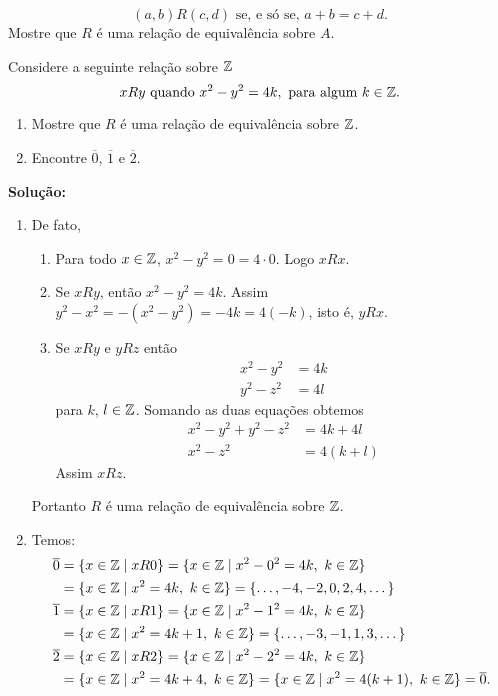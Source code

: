 \documentclass[12pt]{article}
\begin{document}
\[
	(a,b)R(c,d) \mbox{ se, e s\'o se, } a + b = c + d.
\]
Mostre que $R$ \'e uma rela\c{c}\~ao de equival\^encia sobre $A$.

\vspace{.5cm}

\questao Considere a seguinte rela\c{c}\~ao sobre $\mathbb{Z}$
\[
	xRy \mbox{ quando } x^2 - y^2 = 4k, \mbox{ para algum } k \in \mathbb{Z}.
\]

\begin{enumerate}[label={\alph*})]
	\item Mostre que $R$ \'e uma rela{\c c}{\~a}o de equival{\^e}ncia sobre $\mathbb{Z}$.
	\item Encontre $\overline{0}$, $\overline{1}$ e $\overline{2}$.
\end{enumerate}

\noindent\textbf{Solu\c{c}\~ao:}
	\begin{enumerate}[label={\alph*})]
		\item De fato,
		\begin{enumerate}[label={\roman*})]
			\item Para todo $x \in \mathbb{Z}$, $x^2 - y^2 = 0 = 4\cdot 0$. Logo $xRx$.
			\item Se $xRy$, ent\~ao $x^2 - y^2 = 4k$. Assim $y^2 - x^2 = -(x^2 - y^2) = -4k = 4(-k)$, isto \'e, $yRx$.
			\item Se $xRy$ e $yRz$ ent\~ao
			\begin{align}
				x^2 - y^2 &= 4k\label{primeira_equacao}\\
				y^2 - z^2 &= 4l\label{segunda_equacao}
			\end{align}
			para $k$, $l \in \mathbb{Z}$.
			Somando as duas equa\c{c}\~oes obtemos
			\begin{align}\label{terceira_equacao}
				x^2 - y^2 + y^2 - z^2 &= 4k + 4l\\
				x^2 - z^2 &= 4(k + l)
			\end{align}
			Assim $xRz$.
		\end{enumerate}

		Portanto $R$ \'e uma rela\c{c}\~ao de equival\^encia sobre $\mathbb{Z}$.

		\item Temos:
		\begin{align*}
			\overline{0} &= \{x \in \mathbb{Z} \mid xR0\} = \{x \in \mathbb{Z} \mid x^2 - 0^2 = 4k,\ k \in \mathbb{Z}\} \\
			&= \{x \in \mathbb{Z} \mid x^2 = 4k, \ k \in \mathbb{Z}\} = \{\dots, -4,-2,0,2,4, \dots\}\\
			\overline{1} &= \{x \in \mathbb{Z} \mid xR1\} = \{x \in \mathbb{Z} \mid x^2 - 1^2 = 4k,\ k \in \mathbb{Z}\} \\
			&= \{x \in \mathbb{Z} \mid x^2 = 4k + 1, \ k \in \mathbb{Z}\} = \{\dots, -3,-1,1,3, \dots\}\\
			\overline{2} &= \{x \in \mathbb{Z} \mid xR2\} = \{x \in \mathbb{Z} \mid x^2 - 2^2 = 4k,\ k \in \mathbb{Z}\} \\
			&= \{x \in \mathbb{Z} \mid x^2 = 4k + 4, \ k \in \mathbb{Z}\} = \{x \in \mathbb{Z} \mid x^2 = 4(k + 1), \ k \in \mathbb{Z}\} = \overline{0}.
		\end{align*}
	\end{enumerate}
\end{document}
